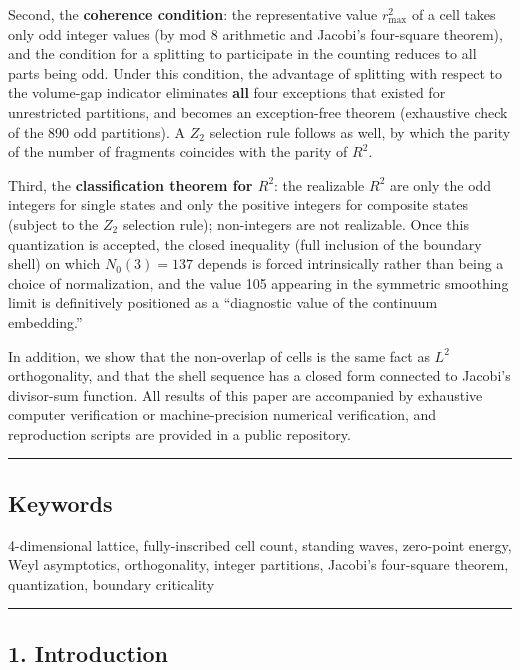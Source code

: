 \documentclass[
]{article}
\begin{document}
Second, the \textbf{coherence condition}: the representative value
\(r_{\max}^2\) of a cell takes only odd integer values (by mod 8
arithmetic and Jacobi's four-square theorem), and the condition for a
splitting to participate in the counting reduces to all parts being odd.
Under this condition, the advantage of splitting with respect to the
volume-gap indicator eliminates \textbf{all} four exceptions that
existed for unrestricted partitions, and becomes an exception-free
theorem (exhaustive check of the 890 odd partitions). A \(Z_2\)
selection rule follows as well, by which the parity of the number of
fragments coincides with the parity of \(R^2\).

Third, the \textbf{classification theorem for \(R^2\)}: the realizable
\(R^2\) are only the odd integers for single states and only the
positive integers for composite states (subject to the \(Z_2\) selection
rule); non-integers are not realizable. Once this quantization is
accepted, the closed inequality (full inclusion of the boundary shell)
on which \(N_0(3)=137\) depends is forced intrinsically rather than
being a choice of normalization, and the value 105 appearing in the
symmetric smoothing limit is definitively positioned as a ``diagnostic
value of the continuum embedding.''

In addition, we show that the non-overlap of cells is the same fact as
\(L^2\) orthogonality, and that the shell sequence has a closed form
connected to Jacobi's divisor-sum function. All results of this paper
are accompanied by exhaustive computer verification or machine-precision
numerical verification, and reproduction scripts are provided in a
public repository.

\begin{center}\rule{0.5\linewidth}{0.5pt}\end{center}

\subsection{Keywords}\label{keywords}

4-dimensional lattice, fully-inscribed cell count, standing waves,
zero-point energy, Weyl asymptotics, orthogonality, integer partitions,
Jacobi's four-square theorem, quantization, boundary criticality

\begin{center}\rule{0.5\linewidth}{0.5pt}\end{center}

\subsection{1. Introduction}\label{introduction}
\end{document}
